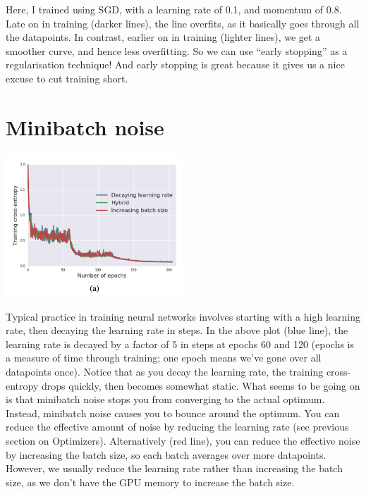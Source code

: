 \documentclass{article}
\newcommand{\0}{\mathbf{0}}
\begin{document}

Here, I trained using SGD, with a learning rate of 0.1, and momentum of 0.8.
Late on in training (darker lines), the line overfits, as it basically goes through all the datapoints. 
In contrast, earlier on in training (lighter lines), we get a smoother curve, and hence less overfitting.
So we can use ``early stopping'' as a regularisation technique!
And early stopping is great because it gives us a nice excuse to cut training short.

\newpage
\section{Minibatch noise}

\begin{center}
  \includegraphics[width=0.5\textwidth]{schedule.png}
\end{center}

Typical practice in training neural networks involves starting with a high learning rate, then decaying the learning rate in steps.
In the above plot (blue line), the learning rate is decayed by a factor of 5 in steps at epochs 60 and 120 (epochs is a measure of time through training; one epoch means we've gone over all datapoints once).
Notice that as you decay the learning rate, the training cross-entropy drops quickly, then becomes somewhat static.
What seems to be going on is that minibatch noise stops you from converging to the actual optimum.
Instead, minibatch noise causes you to bounce around the optimum.
You can reduce the effective amount of noise by reducing the learning rate (see previous section on Optimizers).
Alternatively (red line), you can reduce the effective noise by increasing the batch size, so each batch averages over more datapoints.
However, we usually reduce the learning rate rather than increasing the batch size, as we don't have the GPU memory to increase the batch size.
\end{document}
